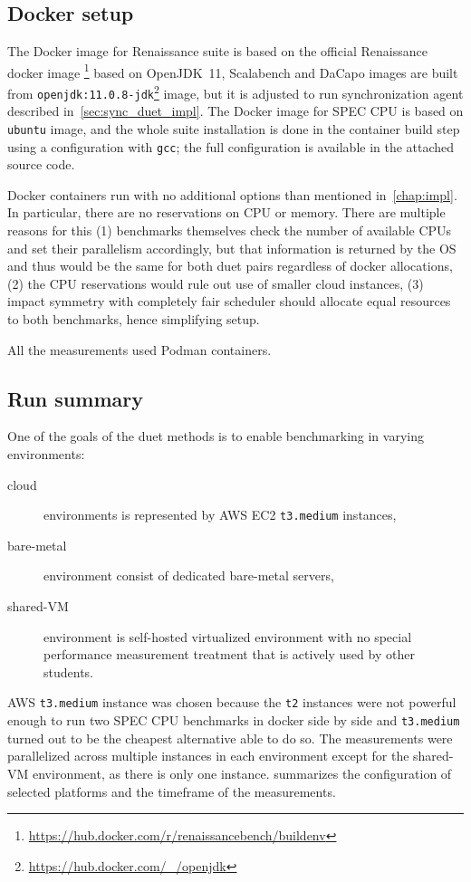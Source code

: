 \subsection{Docker setup}
The Docker image for Renaissance suite is based on the official Renaissance docker image \footnote{\url{https://hub.docker.com/r/renaissancebench/buildenv}} based on OpenJDK~11, Scalabench and DaCapo images are built from \lstinline{openjdk:11.0.8-jdk}\footnote{\url{https://hub.docker.com/_/openjdk}} image, but it is adjusted to run synchronization agent described in~\cref{sec:sync_duet_impl}.
The Docker image for SPEC CPU is based on \lstinline{ubuntu} image, and the whole suite installation is done in the container build step using a configuration with \lstinline{gcc}; the full configuration is available in the attached source code.

Docker containers run with no additional options than mentioned in~\cref{chap:impl}.
In particular, there are no reservations on CPU or memory.
There are multiple reasons for this (1) benchmarks themselves check the number of available CPUs and set their parallelism accordingly, but that information is returned by the OS and thus would be the same for both duet pairs regardless of docker allocations, (2) the CPU reservations would rule out use of smaller cloud instances, (3) impact symmetry with completely fair scheduler should allocate equal resources to both benchmarks, hence simplifying setup.

All the measurements used Podman containers.

\subsection{Run summary}

One of the goals of the duet methods is to enable benchmarking in varying environments:
\begin{description}
	\item[cloud] environments is represented by AWS EC2 \lstinline{t3.medium} instances,
	\item[bare-metal] environment consist of dedicated \mbox{bare-metal} servers,
	\item[shared-VM] environment is \mbox{self-hosted} virtualized environment with no special performance measurement treatment that is actively used by other students.
\end{description}
AWS \lstinline{t3.medium} instance was chosen because the \lstinline{t2} instances were not powerful enough to run two SPEC CPU benchmarks in docker side by side and \lstinline{t3.medium} turned out to be the cheapest alternative able to do so.
The measurements were parallelized across multiple instances in each environment except for the \mbox{shared-VM} environment, as there is only one instance.
 summarizes the configuration of selected platforms and the timeframe of the measurements.

